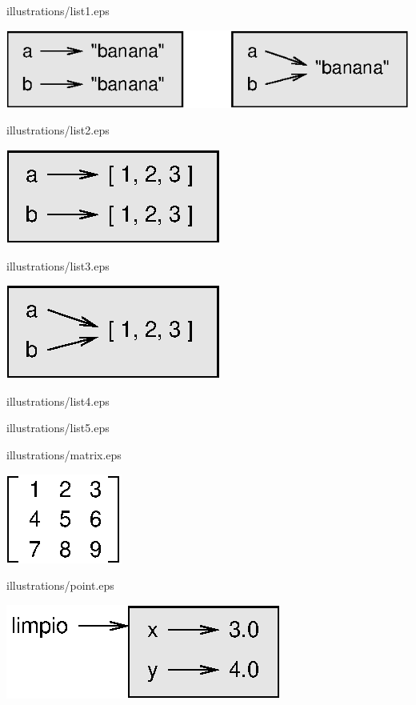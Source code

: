 illustrations/list1.eps

\centerline{\includegraphics{illustrations/list1.eps}}

illustrations/list2.eps

\centerline{\includegraphics{illustrations/list2.eps}}

illustrations/list3.eps

\centerline{\includegraphics{illustrations/list3.eps}}

illustrations/list4.eps


illustrations/list5.eps


illustrations/matrix.eps

\centerline{\includegraphics{illustrations/matrix.eps}}

illustrations/point.eps

\centerline{\includegraphics{illustrations/point.eps}}

